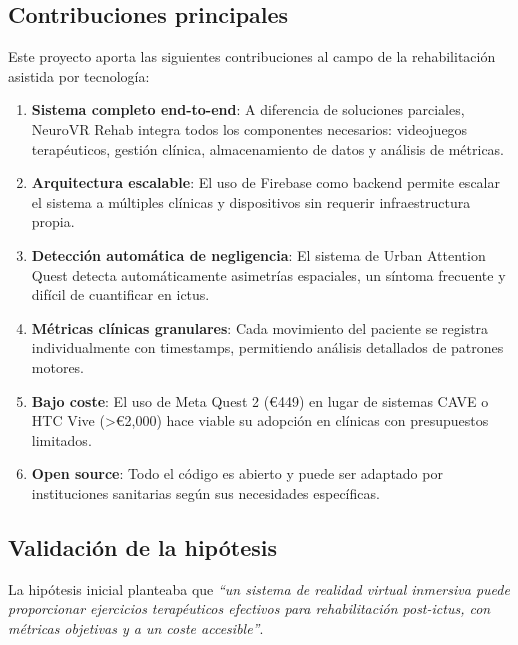\subsection{Contribuciones principales}

Este proyecto aporta las siguientes contribuciones al campo de la rehabilitación asistida por tecnología:

\begin{enumerate}
    \item \textbf{Sistema completo end-to-end}: A diferencia de soluciones parciales, NeuroVR Rehab integra todos los componentes necesarios: videojuegos terapéuticos, gestión clínica, almacenamiento de datos y análisis de métricas.
    
    \item \textbf{Arquitectura escalable}: El uso de Firebase como backend permite escalar el sistema a múltiples clínicas y dispositivos sin requerir infraestructura propia.
    
    \item \textbf{Detección automática de negligencia}: El sistema de Urban Attention Quest detecta automáticamente asimetrías espaciales, un síntoma frecuente y difícil de cuantificar en ictus.
    
    \item \textbf{Métricas clínicas granulares}: Cada movimiento del paciente se registra individualmente con timestamps, permitiendo análisis detallados de patrones motores.
    
    \item \textbf{Bajo coste}: El uso de Meta Quest 2 (€449) en lugar de sistemas CAVE o HTC Vive (>€2,000) hace viable su adopción en clínicas con presupuestos limitados.
    
    \item \textbf{Open source}: Todo el código es abierto y puede ser adaptado por instituciones sanitarias según sus necesidades específicas.
\end{enumerate}

\subsection{Validación de la hipótesis}

La hipótesis inicial planteaba que \textit{``un sistema de realidad virtual inmersiva puede proporcionar ejercicios terapéuticos efectivos para rehabilitación post-ictus, con métricas objetivas y a un coste accesible''}.

